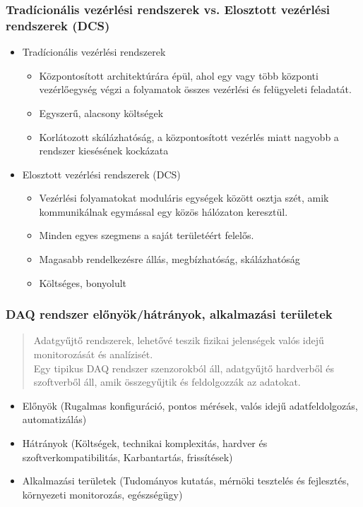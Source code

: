 \subsubsection{Tradícionális vezérlési rendszerek vs. Elosztott vezérlési rendszerek (DCS)}
\begin{itemize}
    \item Tradícionális vezérlési rendszerek
    \begin{itemize}
        \item Központosított architektúrára épül, ahol egy vagy több központi vezérlőegység végzi a folyamatok összes vezérlési és felügyeleti feladatát.
        \item Egyszerű, alacsony költségek
        \item Korlátozott skálázhatóság, a központosított vezérlés miatt nagyobb a rendszer kiesésének kockázata
    \end{itemize}
    \item Elosztott vezérlési rendszerek (DCS)
    \begin{itemize}
        \item Vezérlési folyamatokat moduláris egységek között osztja szét, amik kommunikálnak egymással egy közös hálózaton keresztül.
        \item Minden egyes szegmens a saját területéért felelős.
        \item Magasabb rendelkezésre állás, megbízhatóság, skálázhatóság
        \item Költséges, bonyolult
    \end{itemize}
\end{itemize}

\subsubsection{DAQ rendszer előnyök/hátrányok, alkalmazási területek}
\begin{quote}
    Adatgyűjtő rendszerek, lehetővé teszik fizikai jelenségek valós idejű monitorozását és analízisét. \\
    Egy tipikus DAQ rendszer szenzorokból áll, adatgyűjtő hardverből és szoftverből áll, amik összegyűjtik és feldolgozzák az adatokat.
\end{quote}
\begin{itemize}
    \item Előnyök (Rugalmas konfiguráció, pontos mérések, valós idejű adatfeldolgozás, automatizálás)
    \item Hátrányok (Költségek, technikai komplexitás, hardver és szoftverkompatibilitás, Karbantartás, frissítések)
    \item Alkalmazási területek (Tudományos kutatás, mérnöki tesztelés és fejlesztés, környezeti monitorozás, egészségügy)
\end{itemize}

